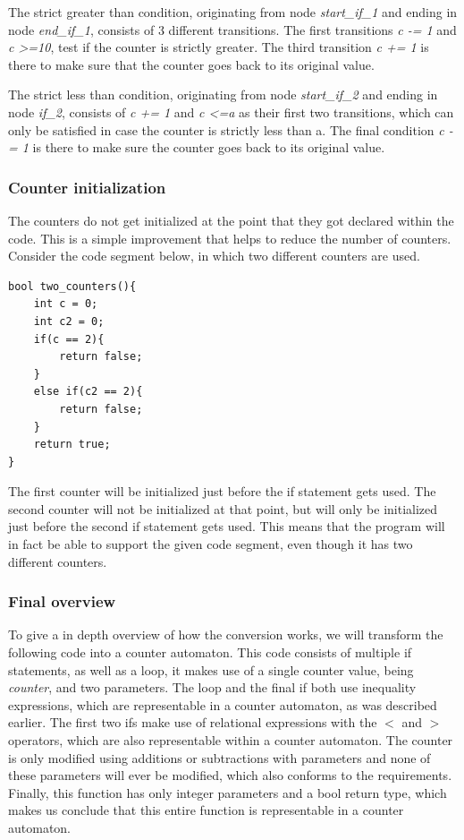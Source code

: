 \documentclass[12pt]{article}
\begin{document}
The strict greater than condition, originating from node \textit{start\_if\_1} and ending in node \textit{end\_if\_1}, consists of 3 different transitions. The first transitions \textit{c -= 1} and \textit{c \textgreater =10}, test if the counter is strictly greater. The third transition \textit{c += 1} is there to make sure that the counter goes back to its original value.

The strict less than condition, originating from node \textit{start\_if\_2} and ending in node \textit{if\_2}, consists of \textit{c += 1} and \textit{c \textless =a} as their first two transitions, which can only be satisfied in case the counter is strictly less than a. The final condition \textit{c -= 1} is there to make sure the counter goes back to its original value.

\subsubsection{Counter initialization}
The counters do not get initialized at the point that they got declared within the code. This is a simple improvement that helps to reduce the number of counters. Consider the code segment below, in which two different counters are used.

\begin{lstlisting}[style=CStyle]
bool two_counters(){
	int c = 0;
	int c2 = 0;
	if(c == 2){
		return false;
	}
	else if(c2 == 2){
		return false;
	}
	return true;
}
\end{lstlisting}
The first counter will be initialized just before the if statement gets used. The second counter will not be initialized at that point, but will only be initialized just before the second if statement gets used. This means that the program will in fact be able to support the given code segment, even though it has two different counters.

\subsubsection{Final overview}
To give a in depth overview of how the conversion works, we will transform the following code into a counter automaton. This code consists of multiple if statements, as well as a loop, it makes use of a single counter value, being \textit{counter}, and two parameters. The loop and the final if both use inequality expressions, which are representable in a counter automaton, as was described earlier. The first two ifs make use of relational expressions with the $<$ and $>$ operators, which are also representable within a counter automaton. The counter is only modified using additions or subtractions with parameters and none of these parameters will ever be modified, which also conforms to the requirements. Finally, this function has only integer parameters and a bool return type, which makes us conclude that this entire function is representable in a counter automaton.
\end{document}
